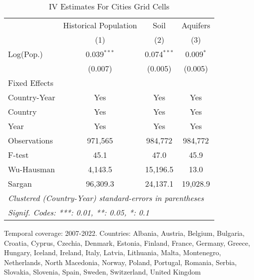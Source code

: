 
\begin{table}[htbp]
   \caption{\label{tab:within_lez_iv_all} IV Estimates For Cities Grid Cells}
   \centering
   \small
   \begin{tabular}{lccc}
      \tabularnewline \midrule \midrule
                   & Historical Population & Soil          & Aquifers \\   
                   & (1)                   & (2)           & (3)\\  
      Log(Pop.)    & 0.039$^{***}$         & 0.074$^{***}$ & 0.009$^{*}$\\   
                   & (0.007)               & (0.005)       & (0.005)\\   
      Fixed Effects\\
      Country-Year & Yes                   & Yes           & Yes\\  
      Country      & Yes                   & Yes           & Yes\\  
      Year         & Yes                   & Yes           & Yes\\  
      \midrule 
      Observations & 971,565               & 984,772       & 984,772\\  
      F-test       & 45.1                  & 47.0          & 45.9\\  
      Wu-Hausman   & 4,143.5               & 15,196.5      & 13.0\\  
      Sargan       & 96,309.3              & 24,137.1      & 19,028.9\\  
      \midrule \midrule
      \multicolumn{4}{l}{\emph{Clustered (Country-Year) standard-errors in parentheses}}\\
      \multicolumn{4}{l}{\emph{Signif. Codes: ***: 0.01, **: 0.05, *: 0.1}}\\
   \end{tabular}
   
   \par \raggedright 
   Temporal coverage: 2007-2022. Countries: Albania, Austria, Belgium, Bulgaria, Croatia, Cyprus, Czechia, Denmark, Estonia, Finland, France, Germany, Greece, Hungary, Iceland, Ireland, Italy, Latvia, Lithuania, Malta, Montenegro, Netherlands, North Macedonia, Norway, Poland, Portugal, Romania, Serbia, Slovakia, Slovenia, Spain, Sweden, Switzerland, United Kingdom
\end{table}


